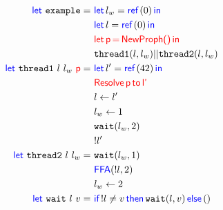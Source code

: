 \documentclass{article}
\begin{document}
\begin{align*}
  \langkws{let}~ \mathtt{example} = \ & \Let l_{w} = \Ref(0) in \\
                                      & \Let l = \Ref(0) in \\
                                      & \langghost{let}\spac \textlang{\color{red} p\spac=} \spac \NewProph \textlang{\color{red}\spac in}\\
                                      & \mathtt{thread1}(l,l_{w}) || \mathtt{thread2}(l,l_{w})\\
  \langkws{let}~ \mathtt{thread1}~ l~ l_w~ \textlang{\color{red} p} = \ & \Let l' = \Ref(42) in \\
                                      & \Resolve \textlang{\color{red} p}To{\textlang{\color{red} l'}}\\
                                      & l \gets l' \\
                                      & l_{w} \gets 1 \\
                                      & \mathtt{wait}(l_{w},2) \\
                                      & !l' \\
  \langkws{let}~ \mathtt{thread2}~ l ~ l_{w} = \  & \mathtt{wait}(l_{w},1)\\
                                      & \langkws{FFA}(!l,2) \\
                                      & l_{w} \gets 2 \\
  \langkws{let}~ \mathtt{wait} ~ l ~ v = \ & \If !l \neq v then \mathtt{wait}(l,v) \Else ()
\end{align*}
\end{document}
